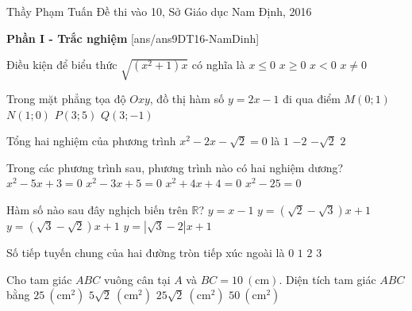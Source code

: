 \begin{name}
{Thầy  Phạm Tuấn}
{Đề thi vào 10, Sở Giáo dục Nam Định, 2016}
\end{name}
\noindent
\textbf{Phần I - Trắc nghiệm}
[ans/ans9DT16-NamDinh]
\begin{ex}%
Điều kiện để biểu thức $\sqrt{(x^2+1)x}$ có nghĩa là
\choice
{$x \leq 0$}
{\True $x \geq 0$}
{$x <0$}
{$x \neq 0$}
\end{ex}
\begin{ex}%
Trong mặt phẳng tọa độ $Oxy$, đồ thị hàm số $y=2x-1$ đi qua điểm 
\choice
{$M(0;1)$}
{$N(1;0)$}
{\True $P(3;5)$}
{$Q(3;-1)$}
\end{ex}

\begin{ex}%
Tổng  hai  nghiệm của phương trình $x^2-2x-\sqrt{2}=0$ là 
\choice 
{$1$}
{$-2$}
{$-\sqrt{2}$}
{\True $2$}
\end{ex}

\begin{ex}%
Trong các phương trình sau, phương trình nào có hai nghiệm dương?
\choice 
{\True $x^2-5x+3=0$}
{$x^2-3x+5=0$}
{$x^2+4x+4=0$}
{$x^2-25=0$}
\end{ex}

\begin{ex}%
Hàm số nào sau đây nghịch biến trên $\mathbb{R}$?
\choice 
{$y=x-1$}
{\True $y=\left (\sqrt{2}-\sqrt{3}\right )x+1$}
{$y=\left (\sqrt{3}-\sqrt{2}\right )x+1$}
{$y=\left |\sqrt{3}-2\right |x+1$}
\end{ex}

\begin{ex}%
Số tiếp tuyến chung của hai đường tròn tiếp xúc ngoài là
\choice 
{$0$}
{$1$}
{$2$}
{\True $3$}
\end{ex}

\begin{ex}%
Cho tam giác $ABC$ vuông cân tại $A$ và $BC=10~(\mathrm{cm})$. Diện tích tam giác $ABC$ bằng 
\choice 
{\True $25~(\mathrm{cm^2})$}
{$5\sqrt{2}~(\mathrm{cm^2})$}
{$25\sqrt{2}~(\mathrm{cm^2})$}
{$50~(\mathrm{cm^2})$}
\end{ex}

